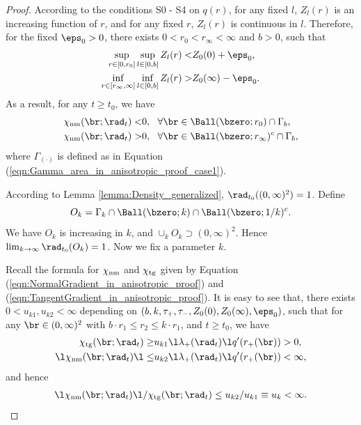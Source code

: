 \documentclass[11pt]{article}
\begin{document}
\begin{proof}
According to the conditions {\sf S0} - {\sf S4} on $q(r)$, for any fixed $l$, $Z_l(r)$ is an increasing function of $r$, and for any fixed $r$, $Z_l(r)$ is continuous in $l$. Therefore, for the fixed $\eps_0 > 0$, there exists $0 < r_0 < r_\infty < \infty$ and $b > 0$, such that
\begin{align}
\sup_{r \in [0, r_0]}\sup_{l \in [0, b]} Z_l(r) <& Z_0(0) + \eps_0,\\
\inf_{r \in [r_\infty, \infty]}\inf_{l \in [0, b]} Z_l(r) >& Z_0(\infty) - \eps_0.
\end{align}
As a result, for any $t \ge t_0$, we have 
\begin{equation}\label{eqn:Boundary1_in_anisotropic_proof_case1}
\begin{aligned}
\chi_{\rm nm}(\br; \rad_t) <& 0, ~~ \forall \br \in \Ball(\bzero; r_0) \cap \Gamma_b,\\
\chi_{\rm nm}(\br; \rad_t) >& 0, ~~ \forall \br \in \Ball(\bzero; r_\infty)^c \cap \Gamma_b,
\end{aligned}
\end{equation}
where $\Gamma_{(\cdot)}$ is defined as in Equation (\ref{eqn:Gamma_area_in_anisotropic_proof_case1}). 

%
According to Lemma \ref{lemma:Density_generalized}, $\rad_{t_0}((0, \infty)^2) = 1$. Define 
\begin{equation}\label{eqn:Ok_in_anisotropic_proof_case1}
O_k = \Gamma_k \cap \Ball(\bzero; k) \cap \Ball(\bzero; 1/k)^c. 
\end{equation}
We have $O_k$ is increasing in $k$, and $\cup_k O_k \supset (0, \infty)^2$. Hence $\lim_{k\to \infty} \rad_{t_0}(O_k) = 1$. Now we fix a parameter $k$. 

Recall the formula for $\chi_{\rm nm}$ and $\chi_{\rm tg}$ given by Equation (\ref{eqn:NormalGradient_in_anisotropic_proof}) and (\ref{eqn:TangentGradient_in_anisotropic_proof}). It is easy to see that, there exists $0 < u_{k1}, u_{k2} < \infty$ depending on $(b, k, \tau_{+}, \tau_{-}, Z_0(0), Z_0(\infty), \eps_0)$, such that for any $\br \in (0, \infty)^2$ with $b \cdot r_1 \le r_2 \le k \cdot r_1$, and $t \ge t_0$, we have
\begin{align}
\chi_{\rm tg}(\br; \rad_t) \ge&   u_{k1} \l \lambda_+(\rad_t)\l q'(r_+(\br)) > 0,\label{eqn:Boundary2_in_anisotropic_proof_case1}\\
\l \chi_{\rm nm}(\br; \rad_t) \l  \le&  u_{k2} \l \lambda_+(\rad_t)\l q'(r_+(\br)) < \infty,
\end{align}
and hence
\begin{equation}\label{eqn:GradientFieldInequality_anisotropic_proof_case1}
\begin{aligned}
\l \chi_{\rm nm}(\br; \rad_t) \l / \chi_{\rm tg}(\br; \rad_t) \le u_{k2} / u_{k1} \equiv u_k < \infty. 
\end{aligned}
\end{equation}


\end{proof}
\end{document}

